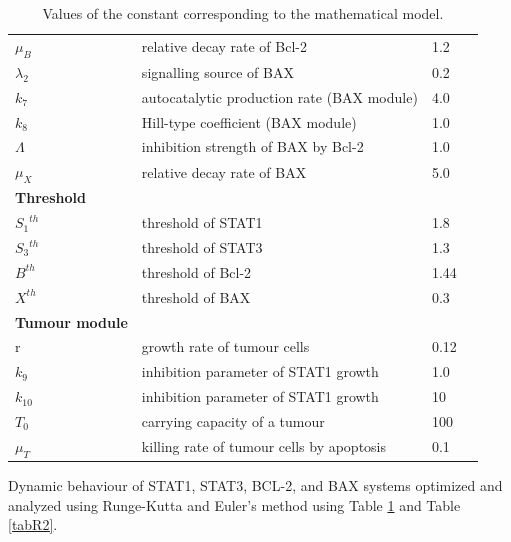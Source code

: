 \begin{table}[hbt!]
\begin{center}
\begin{tabular}{p{2.5cm}|p{9cm}|p{1.2cm}|p{2cm}}
$\mu_B$ & relative decay rate of Bcl-2 & 1.2 &  \cite{andrejeva2002degradation, yang2017porcine}\\
$\lambda_2$ & signalling source of BAX& 0.2 & \cite{lee2021mathematical}\\
$k_7$ & autocatalytic production rate (BAX module) & 4.0 & \cite{lee2021mathematical}\\
$k_8$ & Hill-type coefficient (BAX module) & 1.0 & \cite{lee2021mathematical}\\
$\Lambda$ & inhibition strength of BAX by Bcl-2& 1.0 & \cite{lee2021mathematical}\\
$\mu_X$ & relative decay rate of BAX & 5.0& \cite{magal2005downregulation, xin2005nicotine}\\
\textbf{Threshold} & & & \\ 
\hline
 ${S_1}^{th}$ & threshold of STAT1  & 1.8& \cite{lee2021mathematical}\\
 ${S_3}^{th}$ & threshold of STAT3  & 1.3& \cite{lee2021mathematical}\\
 $B^{th}$ & threshold of Bcl-2  & 1.44& \cite{lee2021mathematical}\\
 $X^{th}$ & threshold of BAX  & 0.3& \cite{lee2021mathematical}\\
\textbf{Tumour module} & & &\\
     \hline
 r& growth rate of tumour cells& 0.12&\cite{catani2016intratumoral}\\
 ${k_9}$& inhibition parameter of STAT1 growth& 1.0&\cite{catani2016intratumoral}\\
 ${k_{10}}$& inhibition parameter of STAT1 growth& 10&\cite{catani2016intratumoral}\\
 ${T_0}$& carrying capacity of a tumour&100&\cite{catani2016intratumoral}\\
${\mu_T}$& killing rate of tumour cells by apoptosis&0.1&\cite{catani2016intratumoral}\\
 \hline
    \end{tabular}
    \caption{Values of the constant corresponding to the mathematical model. }
    \label{tabR1}
    \end{center}
\end{table}

Dynamic behaviour of STAT1, STAT3, BCL-2, and BAX systems optimized and analyzed using Runge-Kutta and Euler's method using Table \ref{tabR1} and Table \ref{tabR2}.

\newpage


